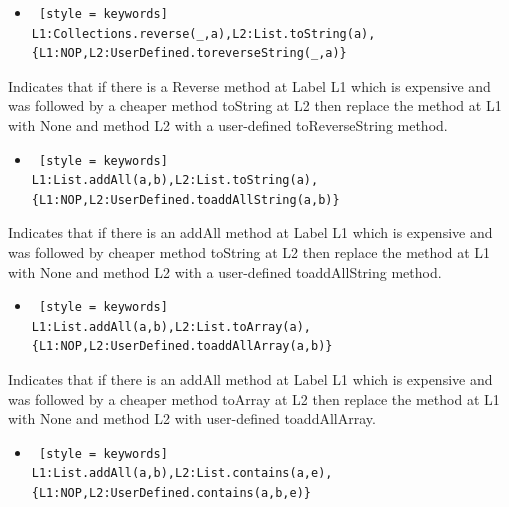\begin{itemize} [leftmargin=0.5cm]
\item \begin{lstlisting} [style = keywords]
L1:Collections.reverse(_,a),L2:List.toString(a),{L1:NOP,L2:UserDefined.toreverseString(_,a)}
\end{lstlisting}
\end{itemize}

Indicates that if there is a Reverse method at Label L1 which is expensive and was followed by a cheaper method toString at L2 then replace the method at L1 with None and method L2 with a user-defined toReverseString method.\\

\begin{itemize} [leftmargin=0.5cm]
\item \begin{lstlisting} [style = keywords]
L1:List.addAll(a,b),L2:List.toString(a),{L1:NOP,L2:UserDefined.toaddAllString(a,b)}
\end{lstlisting}
\end{itemize}

Indicates that if there is an addAll method at Label L1 which is expensive and was followed by cheaper method toString at L2 then replace the method at L1 with None and method L2 with a user-defined toaddAllString method.\\

\begin{itemize} [leftmargin=0.5cm]
\item \begin{lstlisting} [style = keywords]
L1:List.addAll(a,b),L2:List.toArray(a),{L1:NOP,L2:UserDefined.toaddAllArray(a,b)}
\end{lstlisting}
\end{itemize}

Indicates that if there is an addAll method at Label L1 which is expensive and was followed by a cheaper method toArray at L2 then replace the method at L1 with None and method L2 with user-defined toaddAllArray.\\

\begin{itemize} [leftmargin=0.5cm]
\item \begin{lstlisting} [style = keywords]
L1:List.addAll(a,b),L2:List.contains(a,e),{L1:NOP,L2:UserDefined.contains(a,b,e)}
\end{lstlisting}
\end{itemize}

